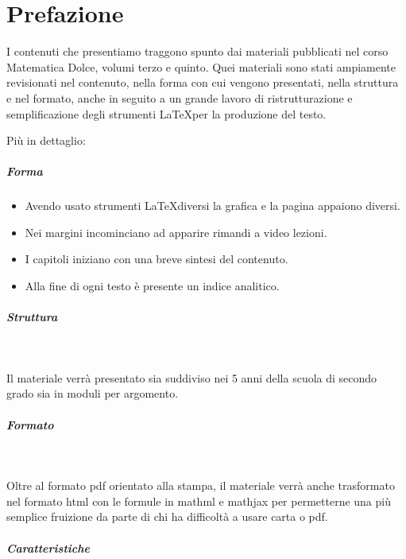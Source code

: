 \chapter{Prefazione}

I contenuti che presentiamo traggono spunto dai materiali pubblicati nel 
corso Matematica Dolce, volumi terzo e quinto. Quei materiali sono stati 
ampiamente revisionati nel contenuto, nella forma con cui vengono 
presentati, nella struttura e nel formato, anche in seguito a un grande 
lavoro di ristrutturazione e semplificazione degli strumenti \LaTeX per 
la produzione del testo.

Più in dettaglio:

\paragraph {Forma}

\begin{itemize} [nosep]
\item 
Avendo usato strumenti \LaTeX diversi la grafica e la pagina 
appaiono diversi.
\item 
Nei margini incominciano ad apparire rimandi a video lezioni.
\item 
I capitoli iniziano con una breve sintesi del contenuto.
\item 
Alla fine di ogni testo è presente un indice analitico.
\end{itemize}

\paragraph {Struttura}~

Il materiale verrà presentato sia 
suddiviso nei 5 anni della scuola di secondo grado sia 
in moduli per argomento.

\paragraph {Formato}~

Oltre al formato pdf orientato alla stampa, il materiale verrà anche 
trasformato nel formato html  con le formule in mathml e mathjax per 
permetterne una più semplice fruizione da parte di chi ha difficoltà a 
usare carta o pdf.

\paragraph {Caratteristiche}~

